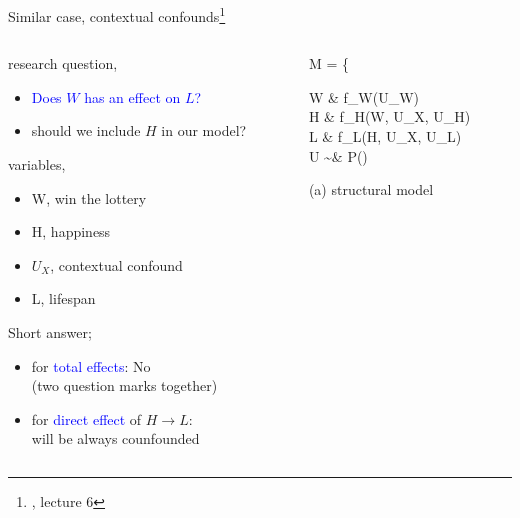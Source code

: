 %
%
\begin{frame}
	{Similar case, contextual confounds\footnote{\citet{McElreath_2022}, lecture 6}}
	\begin{columns}
		\begin{column}{0.5\textwidth}
			research question, 
			\begin{itemize}
				\item \textcolor{blue}{Does $W$ has an effect on $L$?}
				\item should we include $H$ in our model?
			\end{itemize}
			
			variables,
			\begin{itemize}
				\item W, win the lottery 
				\item H, happiness
				\item $U_{X}$, contextual confound 
				\item L, lifespan
			\end{itemize}
			
			Short answer;
			\begin{itemize}
				\item for \textcolor{blue}{total effects}: No \\
				{\small (two question marks together)}
				\item for \textcolor{blue}{direct effect} of $H \rightarrow L$: \\
				will be always counfounded
			\end{itemize}
		\end{column}
		\begin{column}{0.5\textwidth}  
			\begin{equ}
				M = \left\{ \begin{aligned} 
					W \leftarrow & \; f_{W}(U_{W}) \\
					H \leftarrow & \; f_{H}(W, U_{X}, U_{H}) \\
					L \leftarrow & \; f_{L}(H, U_{X}, U_{L}) \\
					U \sim & \; P()
				\end{aligned} \right
				\caption*{(a) structural model}
			\end{equ}
			\begin{figure}
\end{figure}
\end{column}
\end{columns}
\end{frame}
